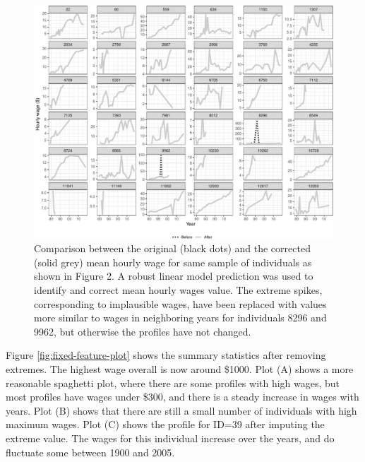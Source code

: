 \documentclass[12pt]{article}
\begin{document}
\begin{figure}

{\centering \includegraphics[width=0.9\linewidth]{figures/compare-plot-1}

}

\caption{Comparison between the original (black dots) and the corrected (solid grey) mean hourly wage for same sample of individuals as shown in Figure 2. A robust linear model prediction was used to identify and correct mean hourly wages value. The extreme spikes, corresponding to implausible wages, have been replaced with values more similar to wages in neighboring years for individuals 8296 and 9962, but otherwise the profiles have not changed.}\label{fig:compare-plot}
\end{figure}

Figure \ref{fig:fixed-feature-plot} shows the summary statistics after removing extremes. The highest wage overall is now around \$1000. Plot (A) shows a more reasonable spaghetti plot, where there are some profiles with high wages, but most profiles have wages under \$300, and there is a steady increase in wages with years. Plot (B) shows that there are still a small number of individuals with high maximum wages. Plot (C) shows the profile for ID=39 after imputing the extreme value. The wages for this individual increase over the years, and do fluctuate some between 1900 and 2005.
\end{document}
